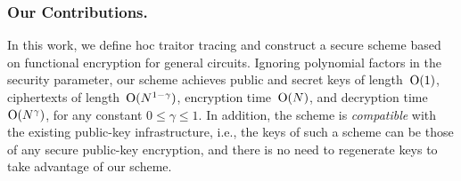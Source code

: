 \subsubsection{Our Contributions.}
In this work, we define \ad hoc traitor tracing and construct a secure scheme based on functional encryption for general circuits.
Ignoring polynomial factors in the security parameter,
our scheme achieves public and secret keys of length~$\operatorname{O}(1)$, ciphertexts of length~$\operatorname{O}(N^{1-\gamma})$, encryption time~$\operatorname{O}(N)$, and decryption time~$\operatorname{O}(N^\gamma)$, for any constant ${0\leq\gamma\leq 1}$.
In addition, the scheme is \emph{compatible} with the existing public-key infrastructure,
i.e., the keys of such a scheme can be those of any secure public-key encryption, and
there is no need to regenerate keys to take advantage of our scheme.
